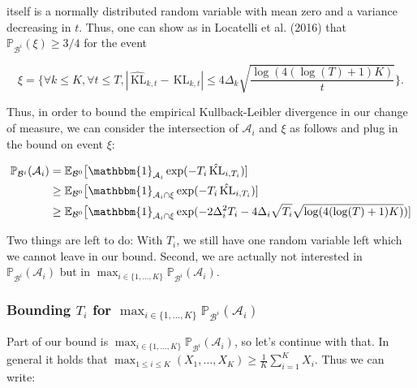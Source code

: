 \documentclass[12pt,]{article}
\newcommand{\KL}{\,\text{KL}}
\begin{document}
itself is a normally distributed random variable with mean zero and a
variance decreasing in \(t\). Thus, one can show as in Locatelli et al.
(2016) that \(\mathbb{P}_{\mathcal{B}^i}(\xi) \geq 3/4\) for the event

\begin{equation}
\xi = \{ \forall k \leq K, \forall t \leq T, |\hat{\KL}_{k,t} - \KL_{k,t}| \leq 4 \Delta_k \sqrt{\frac{\log(4(\log(T)+1)K)}{t}}\}. \label{LocatelliTheorem1EventXi}
\end{equation}

Thus, in order to bound the empirical Kullback-Leibler divergence in our
change of measure, we can consider the intersection of \(\mathcal{A}_i\)
and \(\xi\) as follows and plug in the bound on event \(\xi\):

\begin{align*}
\mathbb{P}_{\mathcal{B}^i}(\mathcal{A}_i) & = \mathbb{E}_{\mathcal{B}^0} \big[\mathbbm{1}_{\mathcal{A}_i} \exp (- T_i \hat{\KL}_{i,T_i}) ] \\
& \geq \mathbb{E}_{\mathcal{B}^0} \big[\mathbbm{1}_{\mathcal{A}_i \cap \xi} \exp (- T_i \hat{\KL}_{i,T_i}) ] \\
& \geq \mathbb{E}_{\mathcal{B}^0} \big[\mathbbm{1}_{\mathcal{A}_i \cap \xi} \exp (- 2 \Delta_i^2 T_i - 4 \Delta_i \sqrt{T_i} \sqrt{\log(4(\log(T)+1)K)}) ]
\end{align*}

Two things are left to do: With \(T_i\), we still have one random
variable left which we cannot leave in our bound. Second, we are
actually not interested in \(\mathbb{P}_{\mathcal{B}^i}(\mathcal{A}_i)\)
but in
\(\max_{i \in \{1,\dots,K\}} \mathbb{P}_{\mathcal{B}^i}(\mathcal{A}_i)\).

\subsubsection{\texorpdfstring{Bounding \(T_i\) for
\(\max_{i \in \{1,\dots,K\}}\mathbb{P}_{\mathcal{B}^i}(\mathcal{A}_i)\)}{Bounding T\_i for \textbackslash{}max\_\{i \textbackslash{}in \textbackslash{}\{1,\textbackslash{}dots,K\textbackslash{}\}\}\textbackslash{}mathbb\{P\}\_\{\textbackslash{}mathcal\{B\}\^{}i\}(\textbackslash{}mathcal\{A\}\_i)}}\label{bounding-t_i-for-max_i-in-1dotskmathbbp_mathcalbimathcala_i}

Part of our bound is
\(\max_{i \in \{1,\dots,K\}} \mathbb{P}_{\mathcal{B}^i}(\mathcal{A}_i)\),
so let's continue with that. In general it holds that
\(\max_{1 \leq i \leq K} (X_1, \dots, X_K) \geq \frac{1}{K}\sum_{i=1}^K X_i\).
Thus we can write:
\end{document}
